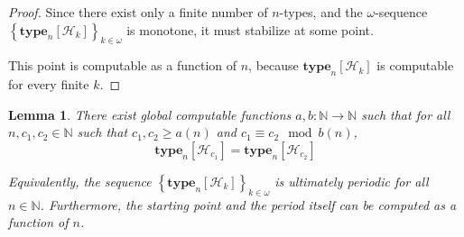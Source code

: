 \documentclass{article}
\newtheorem{lemma}{Lemma}
\newcommand{\brackets}[1]{\left[ {#1} \right]}
\newcommand{\braces}[1]{\left\{ {#1} \right\}}
\newcommand{\NN}{\mathbb{N}}
\newcommand{\type}[2]{\mathbf{type}_{#1} \brackets{#2}}
\begin{document}
\begin{proof}
  Since there exist only a finite number of $n$-types,
  and the $\omega$-sequence $\braces{\type{n}{\mathcal{H}_{k}}}_{k \in \omega}$ is monotone,
  it must stabilize at some point.

  This point is computable as a function of $n$, because
  $\type{n}{\mathcal{H}_{k}}$ is computable for every finite $k$.
\end{proof}


\begin{lemma}
  There exist global computable functions $a, b : \NN \to \NN$ such that
  for all $n, c_1, c_2 \in \NN$ such that $c_1, c_2 \ge a(n)$ and $c_1 \equiv c_2 \mod b(n)$,
  $$\type{n}{\mathcal{H}_{c_1}} = \type{n}{\mathcal{H}_{c_2}}$$

  Equivalently, the sequence $\braces{\type{n}{\mathcal{H}_{k}}}_{k \in \omega}$ 
  is ultimately periodic for all $n \in \NN$. Furthermore, the starting point and the period
  itself can be computed as a function of $n$.
\end{lemma}
\end{document}
